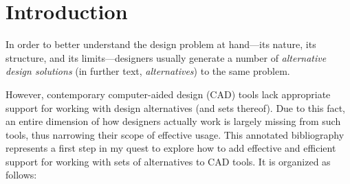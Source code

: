	
\newpage
\section{Introduction}

In order to better understand the design problem at hand---its nature, its structure, and 
its limits---designers usually generate a number of {\em alternative design solutions} 
(in further text, {\em alternatives}) to the same problem.



However, contemporary computer-aided design (CAD) tools lack appropriate support for 
working with %
design alternatives (and sets thereof).
%
Due to this fact, an entire dimension of how designers actually work 
is largely missing from such tools, thus narrowing their scope of effective usage.
%
This annotated bibliography represents a first step in my quest to explore 
how to add effective and efficient support for working with sets of alternatives to CAD tools.
It is organized as follows:

